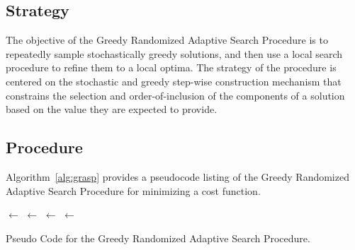 \subsection{Strategy}
The objective of the Greedy Randomized Adaptive Search Procedure is to repeatedly sample stochastically greedy solutions, and then use a local search procedure to refine them to a local optima.
The strategy of the procedure is centered on the stochastic and greedy step-wise construction mechanism that constrains the selection and order-of-inclusion of the components of a solution based on the value they are expected to provide.

\subsection{Procedure}
Algorithm~\ref{alg:grasp} provides a pseudocode listing of the Greedy Randomized Adaptive Search Procedure for minimizing a cost function.

\begin{algorithm}[htp]
	\SetLine
	\KwIn{\Alpha}
	\KwOut{\Best}
	\Best $\leftarrow$ \ConstructRandomSolution{}\;
	\While{$\neg$ \StopCondition{}} {
		\Candidate $\leftarrow$ \GreedyRandomizedConstruction{\Alpha}\;
		\Candidate $\leftarrow$ \LocalSearch{\Candidate}\;
		\If{\Cost{\Candidate} $<$ \Cost{\Best}} {
			\Best $\leftarrow$ \Candidate\;
		}
	}
	\Return{\Best}\;
	\caption{Pseudo Code for the Greedy Randomized Adaptive Search Procedure.}
	\label{alg:grasp}
\end{algorithm}


